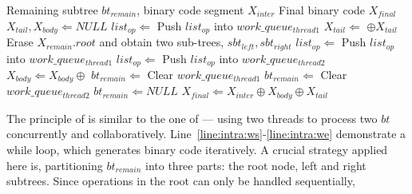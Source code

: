 \begin{algorithm}[!ht]
    \caption{}
    \begin{algorithmic}[1]
        \Require    Remaining subtree $bt_{remain}$, binary code segment $X_{inter}$
        \Ensure     Final binary code $X_{final}$
        \State $X_{tail}, X_{body} \Leftarrow NULL$
            \label{line:intra:ws}
            \State $list_{op} \Leftarrow$ 
            \State Push $list_{op}$ into $work\_queue_{thread1}$
            \State $X_{tail} \Leftarrow$  $\oplus X_{tail}$
            \State Erase $X_{remain}.root$ and obtain two sub-trees, $sbt_{left}, sbt_{right}$
            \Statex
            \State $list_{op} \Leftarrow$ 
            \State Push $list_{op}$ into $work\_queue_{thread1}$
            \State $list_{op} \Leftarrow$ 
            \State Push $list_{op}$ into $work\_queue_{thread2}$
            \State $X_{body} \Leftarrow X_{body} \oplus$ 
            \Statex
                \State $bt_{remain} \Leftarrow$ 
                \State Clear $work\_queue_{thread1}$
                \State $bt_{remain} \Leftarrow$ 
                \State Clear $work\_queue_{thread2}$
            \Else
                \State $bt_{remain} \Leftarrow NULL$
            \EndIf
        \EndWhile   \label{line:intra:we}
        \State $X_{final} \Leftarrow X_{inter} \oplus X_{body} \oplus X_{tail}$
        \State {}
    \end{algorithmic}
    \label{alg:intra}
\end{algorithm}
        The principle of  is similar to the one of  ---
        using two threads to process two $bt$ concurrently and collaboratively.
        Line~\ref{line:intra:ws}-\ref{line:intra:we} demonstrate a while loop, 
        which generates binary code iteratively.
        A crucial strategy applied here is, partitioning $bt_{remain}$ into three parts:
        the root node, left and right subtrees.
        Since operations in the root can only be handled sequentially, 
